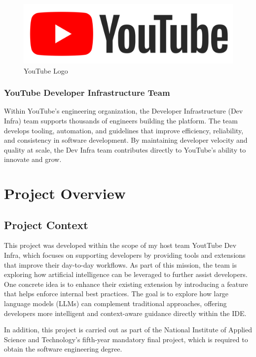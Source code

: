 \begin{spacing}{1.2}
\begin{figure}[!ht]\centering
\includegraphics[scale=0.07]{Images/youtube_logo.png}
\caption{YouTube Logo}
\label{fig:youtube_logo}
\end{figure}

\subsubsection{YouTube Developer Infrastructure Team}
Within YouTube’s engineering organization, the Developer Infrastructure (Dev Infra) team supports thousands of engineers building the platform. The team develops tooling, automation, and guidelines that improve efficiency, reliability, and consistency in software development. By maintaining developer velocity and quality at scale, the Dev Infra team contributes directly to YouTube’s ability to innovate and grow.




\section{Project Overview}

\subsection{Project Context}
This project was developed within the scope of my host team YoutTube Dev Infra, which focuses on supporting developers by providing tools and extensions that improve their day-to-day workflows. As part of this mission, the team is exploring how artificial intelligence can be leveraged to further assist developers. One concrete idea is to enhance their existing extension by introducing a feature that helps enforce internal best practices. The goal is to explore how large language models (LLMs) can complement traditional approaches, offering developers more intelligent and context-aware guidance directly within the IDE.

In addition, this project is carried out as part of the National Institute of Applied Science and Technology’s fifth-year mandatory final project, which is required to obtain the software engineering degree.


\end{spacing}
